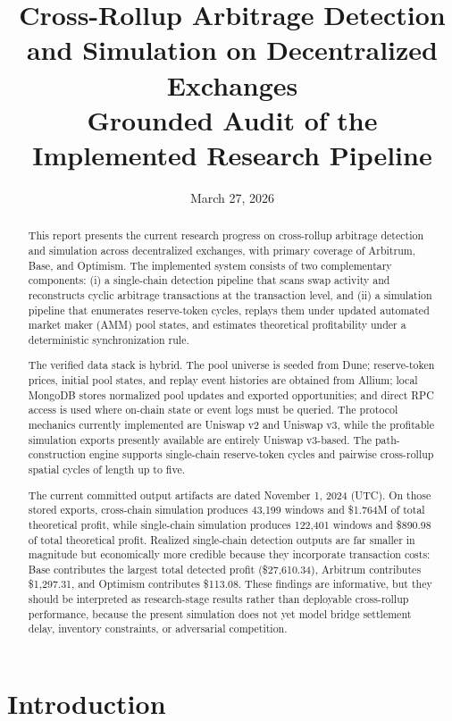 \documentclass[11pt]{article}
\title{\textbf{Cross-Rollup Arbitrage Detection and Simulation on Decentralized Exchanges}\\
\vspace{0.4em}
\large Grounded Audit of the Implemented Research Pipeline}
\author{}
\date{March 27, 2026}
\begin{document}
\maketitle

\begin{abstract}
This report presents the current research progress on cross-rollup arbitrage detection and simulation across decentralized exchanges, with primary coverage of Arbitrum, Base, and Optimism. The implemented system consists of two complementary components: (i) a single-chain detection pipeline that scans swap activity and reconstructs cyclic arbitrage transactions at the transaction level, and (ii) a simulation pipeline that enumerates reserve-token cycles, replays them under updated automated market maker (AMM) pool states, and estimates theoretical profitability under a deterministic synchronization rule.

The verified data stack is hybrid. The pool universe is seeded from Dune; reserve-token prices, initial pool states, and replay event histories are obtained from Allium; local MongoDB stores normalized pool updates and exported opportunities; and direct RPC access is used where on-chain state or event logs must be queried. The protocol mechanics currently implemented are Uniswap v2 and Uniswap v3, while the profitable simulation exports presently available are entirely Uniswap v3-based. The path-construction engine supports single-chain reserve-token cycles and pairwise cross-rollup spatial cycles of length up to five.

The current committed output artifacts are dated November 1, 2024 (UTC). On those stored exports, cross-chain simulation produces 43{,}199 windows and \$1.764M of total theoretical profit, while single-chain simulation produces 122{,}401 windows and \$890.98 of total theoretical profit. Realized single-chain detection outputs are far smaller in magnitude but economically more credible because they incorporate transaction costs: Base contributes the largest total detected profit (\$27{,}610.34), Arbitrum contributes \$1{,}297.31, and Optimism contributes \$113.08. These findings are informative, but they should be interpreted as research-stage results rather than deployable cross-rollup performance, because the present simulation does not yet model bridge settlement delay, inventory constraints, or adversarial competition.
\end{abstract}

\section{Introduction}
\end{document}
